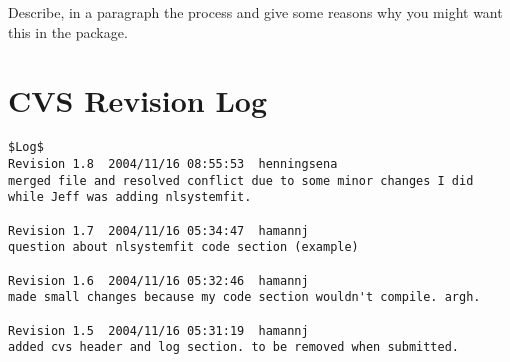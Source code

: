 \documentclass[article]{jss}
\begin{document}
Describe, in a paragraph the process and give some reasons why you
might want this in the package. 


\section{CVS Revision Log}
\begin{verbatim}
$Log$
Revision 1.8  2004/11/16 08:55:53  henningsena
merged file and resolved conflict due to some minor changes I did while Jeff was adding nlsystemfit.

Revision 1.7  2004/11/16 05:34:47  hamannj
question about nlsystemfit code section (example)

Revision 1.6  2004/11/16 05:32:46  hamannj
made small changes because my code section wouldn't compile. argh.

Revision 1.5  2004/11/16 05:31:19  hamannj
added cvs header and log section. to be removed when submitted.

\end{verbatim}




%
\end{document}
